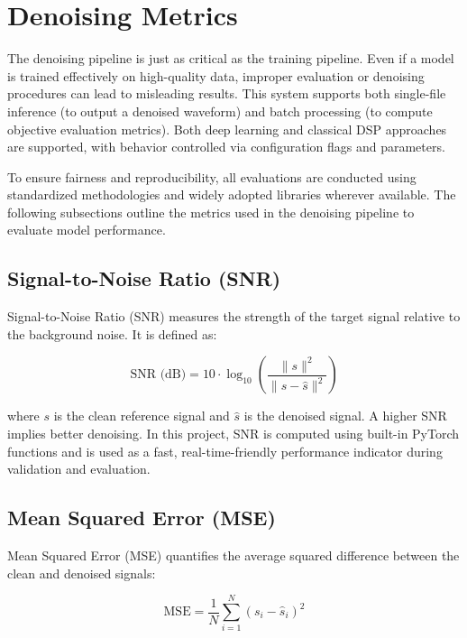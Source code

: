 
\section{Denoising Metrics}
\label{sec:denoising_metrics}

The denoising pipeline is just as critical as the training pipeline. Even if a model is trained effectively on high-quality data, improper evaluation or denoising procedures can lead to misleading results. This system supports both single-file inference (to output a denoised waveform) and batch processing (to compute objective evaluation metrics). Both deep learning and classical DSP approaches are supported, with behavior controlled via configuration flags and parameters.

To ensure fairness and reproducibility, all evaluations are conducted using standardized methodologies and widely adopted libraries wherever available. The following subsections outline the metrics used in the denoising pipeline to evaluate model performance.

\subsection{Signal-to-Noise Ratio (SNR)}
\label{subsec:snr}

Signal-to-Noise Ratio (SNR) measures the strength of the target signal relative to the background noise. It is defined as:

\begin{equation}
\text{SNR (dB)} = 10 \cdot \log_{10} \left( \frac{\| s \|^2}{\| s - \hat{s} \|^2} \right)
\end{equation}

where $s$ is the clean reference signal and $\hat{s}$ is the denoised signal. A higher SNR implies better denoising. In this project, SNR is computed using built-in PyTorch functions and is used as a fast, real-time-friendly performance indicator during validation and evaluation.

\subsection{Mean Squared Error (MSE)}
\label{subsec:mse}

Mean Squared Error (MSE) quantifies the average squared difference between the clean and denoised signals:

\begin{equation}
\text{MSE} = \frac{1}{N} \sum_{i=1}^{N} (s_i - \hat{s}_i)^2
\end{equation}

